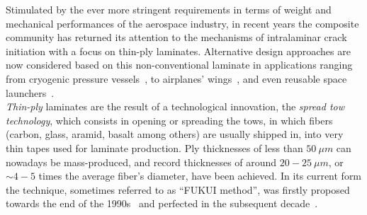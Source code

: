 Stimulated by the ever more stringent requirements in terms of weight and mechanical performances of the aerospace industry, in recent years the composite community has returned its attention to the mechanisms of intralaminar crack initiation with a focus on thin-ply laminates. Alternative design approaches are now considered based on this non-conventional laminate in applications ranging from cryogenic pressure vessels~\cite{McCarville2018}, to airplanes' wings~\cite{Kim2017}, and even reusable space launchers~\cite{Kopp2017}.\\
\emph{Thin-ply} laminates are the result of a technological innovation, the \emph{spread tow technology}, which consists in opening or spreading the tows, in which fibers (carbon, glass, aramid, basalt among others) are usually shipped in, into very thin tapes used for laminate production. Ply thicknesses of less than $50\ \mu m$ can nowadays be mass-produced, and record thicknesses of around $20-25\ \mu m$, or $\sim 4-5$ times the average fiber's diameter, have been achieved. In its current form the technique, sometimes referred to as ``FUKUI method'', was firstly proposed towards the end of the 1990s~\cite{Kawabe1997} and perfected in the subsequent decade~\cite{Kawabe2008,Kawabe2008en}.\\
